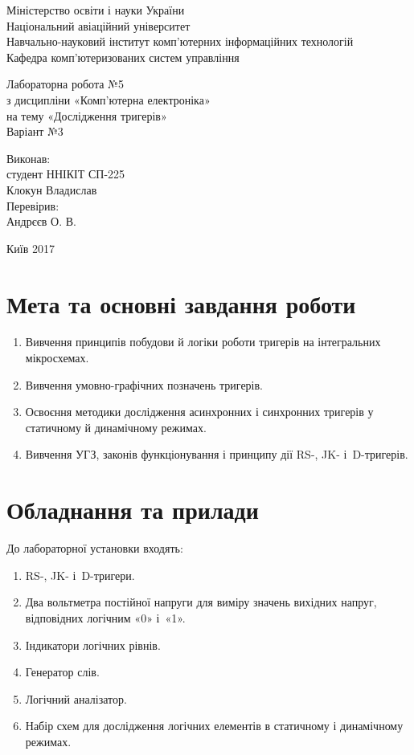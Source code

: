\documentclass[a4paper,oneside,DIV=10,12pt]{scrartcl}
\begin{document}
	\begin{titlepage}
	\begin{center}
		Міністерство освіти і науки України\\
		Національний авіаційний університет\\
		Навчально-науковий інститут комп'ютерних інформаційних технологій\\
		Кафедра комп'ютеризованих систем управління

		\vspace{\fill}
		Лабораторна робота №5\\
		з дисципліни «Комп'ютерна електроніка»\\
		на тему «Дослідження тригерів»\\
		Варіант №3
		
		\vspace{\fill}
		\begin{flushright}
		Виконав:\\
		студент ННІКІТ СП-225\\
		Клокун Владислав\\
		Перевірив:\\
		Андрєєв О. В.
		\end{flushright}
		
		Київ 2017
	\end{center}
	\end{titlepage}
	
	\section{Мета та основні завдання роботи}
		\begin{enumerate}
			\item Вивчення принципів побудови й логіки роботи тригерів на інтегральних мікросхемах.
			\item Вивчення умовно-графічних позначень тригерів.
			\item Освоєння методики дослідження асинхронних і синхронних тригерів у статичному й динамічному режимах.
			\item Вивчення УГЗ, законів функціонування і принципу дії RS-, JK- і~D-тригерів.
		\end{enumerate}
	
	\section{Обладнання та прилади}
		До лабораторної установки входять:
		\begin{enumerate}
			\item RS-, JK- і~D-тригери.
			\item Два вольтметра постійної напруги для виміру значень вихідних напруг, відповідних логічним «0» і~«1».
			\item Індикатори логічних рівнів.
			\item Генератор слів.
			\item Логічний аналізатор.
			\item Набір схем для дослідження логічних елементів в статичному і динамічному режимах.
		\end{enumerate}
		
\end{document}
